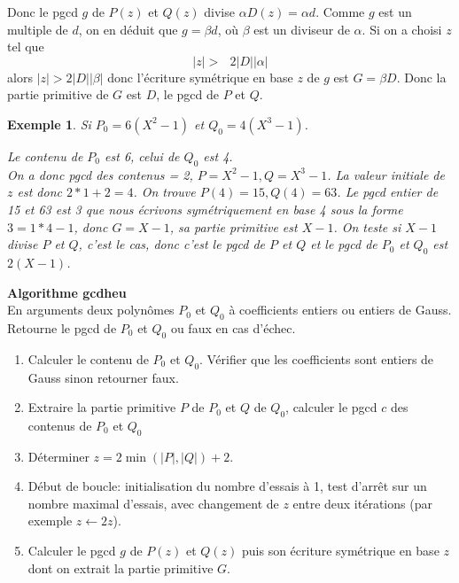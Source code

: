 \documentclass[a4paper,11pt]{article}
\newtheorem{example}[thm]{Exemple}
\begin{document}
\begin{giacjshere}
\begin{itemize}
  
  Donc le pgcd $g$ de $P ( z )$ et $Q ( z )$ divise $\alpha D ( z ) = \alpha
  d$. Comme $g$ est un multiple de $d$, on en déduit que $g = \beta d$, où
  $\beta$ est un diviseur de $\alpha$. Si on a choisi $z$ tel que
  \[ | z | > \text{ $2 | D | | \alpha |$} \]
  alors $| z | > 2 | D | | \beta |$ donc l'écriture symétrique en base $z$ de
  $g$ est $G = \beta D$. Donc la partie primitive de $G$ est $D$, le
  pgcd de $P$ et $Q$.
  
  
\end{itemize}
\begin{example}
  Si $P_0 = 6 ( X^2 - 1 )$ et $Q_0 = 4 ( X^3 - 1 )$.
  
  Le contenu de $P_0$ est 6, celui de $Q_0$ est 4.\\
  On a donc pgcd des contenus = 2, $P = X^2 - 1, Q = X^3 - 1$. La valeur
  initiale de $z$ est donc $2 \ast 1 + 2 = 4$. On trouve $P ( 4 ) = 15, Q ( 4
  ) = 63$. Le pgcd entier de 15 et 63 est 3 que nous écrivons symétriquement
  en base 4 sous la forme $3 = 1 \ast 4 - 1$, donc $G = X - 1$, sa partie
  primitive est $X - 1$. On teste si $X - 1$ divise $P$ et $Q$, c'est le cas,
  donc c'est le pgcd de $P$ et $Q$ et le pgcd de $P_0$ et $Q_0$ est $2 ( X - 1
  )$.
\end{example}

{\bf Algorithme gcdheu}\\
En arguments deux polynômes $P_0$ et $Q_0$ à coefficients entiers ou entiers
de Gauss. Retourne le pgcd de 
$P_0$ et $Q_0$ ou faux en cas d'échec.
\begin{enumerate}
  \item Calculer le contenu de $P_0$ et $Q_0$. Vérifier que les coefficients
  sont entiers de Gauss sinon retourner faux.
  
  \item Extraire la partie primitive $P$ de $P_0$ et $Q$ de $Q_0$, calculer le
  pgcd $c$ des contenus de $P_0$ et $Q_0$
  
  \item Déterminer $z = 2 \min ( | P |, | Q | ) + 2$.
  
  \item Début de boucle: initialisation du nombre d'essais à 1, test d'arrêt
  sur un nombre maximal d'essais, avec changement de $z$ entre deux itérations
  (par exemple $z \leftarrow 2 z$).
  
  \item Calculer le pgcd $g$ de $P ( z )$ et $Q ( z )$ puis son écriture
  symétrique en base $z$ dont on extrait la partie primitive $G$.
  

\end{enumerate}
\end{giacjshere}
\end{document}
